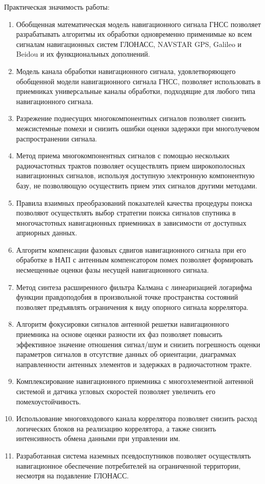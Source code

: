 Практическая значимость работы:
\begin{enumerate}
\item Обобщенная математическая модель навигационного сигнала ГНСС позволяет разрабатывать алгоритмы их обработки одновременно применимые ко всем сигналам навигационных систем ГЛОНАСС, NAVSTAR GPS, Galileo и Beidou и их функциональных дополнений.
\item Модель канала обработки навигационного сигнала, удовлетворяющего обобщенной модели навигационного сигнала ГНСС, позволяет использовать в приемниках универсальные каналы обработки, подходящие для любого типа навигационного сигнала. 
\item Разрежение поднесущих многокомпонентных сигналов позволяет снизить межсистемные помехи и снизить ошибки оценки задержки при многолучевом распространении сигнала.
\item Метод приема многокомпонентных сигналов с помощью нескольких радиочастотных трактов позволяет осуществлять прием широкополосных навигационных сигналов, используя доступную электронную компонентную базу, не позволяющую осуществить прием этих сигналов другими методами.
\item Правила взаимных преобразований показателей качества процедуры поиска позволяют осуществлять выбор стратегии поиска сигналов спутника в многочастотных навигационных приемниках в зависимости от доступных априорных данных. 
\item Алгоритм компенсации фазовых сдвигов навигационного сигнала при его обработке в НАП с антенным компенсатором помех позволяет формировать несмещенные оценки фазы несущей навигационного сигнала. 
\item Метод синтеза расширенного фильтра Калмана с линеаризацией логарифма функции правдоподобия в произвольной точке пространства состояний позволяет предъявлять ограничения к виду опорного сигнала коррелятора.
\item Алгоритм фокусировки сигналов антенной решетки навигационного приемника на основе оценки разности их фаз позволяет повысить эффективное значение отношения сигнал/шум и снизить погрешность оценки параметров сигналов в отсутствие данных об ориентации, диаграммах направленности антенных элементов и задержках в радиочастотном тракте.
\item Комплексирование навигационного приемника с многоэлементной антенной системой и датчика угловых скоростей позволяет увеличить его помехоустойчивость. 
\item Использование многовходового канала коррелятора позволяет снизить расход логических блоков на реализацию коррелятора, а также снизить интенсивность обмена данными при управлении им. 
\item Разработанная система наземных псевдоспутников позволяет осуществлять навигационное обеспечение потребителей на ограниченной территории, несмотря на подавление ГЛОНАСС.
\end{enumerate}

